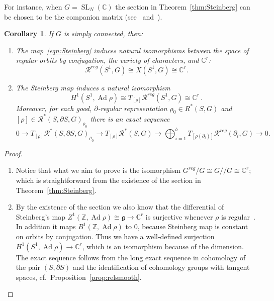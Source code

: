 \documentclass[11pt]{article}
\newtheorem{coro}[theo]{Corollary}
\theoremstyle{definition}
\newenvironment{proofc}{\begin{proof}}{\end{proof}}
\numberwithin{equation}{section}
\numberwithin{figure}{section}
\numberwithin{table}{section}
\DeclareMathOperator{\SL}{SL}
\DeclareMathOperator{\Ad}{Ad}
\newcommand{\Rcal}{\mathcal{R}}
\newcommand{\Cbb}{\mathbb{C}}
\newcommand{\Zbb}{\mathbb{Z}}
\newcommand{\gfrk}{\mathfrak{g}}
\newcommand*{\romanenumi}{\renewcommand*{\theenumi}{\roman{enumi}}}
\begin{document}
For instance, when $G=\SL_N (\Cbb)$ the section in Theorem~\ref{thm:Steinberg} can be chosen to be the companion matrix (see~\cite[p.~120]{Steinberg} and~\cite[Section~4.15]{Humphreys}).


\begin{coro}\label{coro:Steinberg}
If $G$ is simply connected, then:
\begin{enumerate}\romanenumi
\item \label{coro-i}
The map~\eqref{eqn:Steinberg} induces natural isomorphisms between the space of regular orbits by conjugation, the variety of characters, and $\Cbb^r$:
\[
\Rcal^{reg}(S^1, G)\cong X(S^1, G)\cong \Cbb^r.
\]
\item \label{coro-ii}
The Steinberg map induces a natural isomorphism
\[
H^ 1(S^1,\Ad\rho)\cong T_{[\rho]}\Rcal^{reg}(S^1, G)\cong \Cbb^r\,.
\]
Moreover, for each good, $\partial$-regular representation $\rho_0\in R^*(S,G)$ and $ [\rho]\in\Rcal^*(S,\partial S,G)_{\rho_0}$ there is an exact sequence
\[
0\to T_{[\rho]}\Rcal^*(S,\partial S,G)_{\rho_0} \to T_{[\rho]}\Rcal^*(S,G) \to \bigoplus_{i=1}^b T_{[\rho(\partial_i)]} \Rcal^{reg}(\partial_i, G)
\to 0.
\]
\end{enumerate}
\end{coro}

\begin{proofc}
\begin{enumerate}\romanenumi
\item[{\eqref{coro-i}}] Notice that what we aim to prove is the isomorphism $ G^{reg}/G\cong G /\!\!/ G\cong \Cbb^r$; which is straightforward from the existence of the section in Theorem~\ref{thm:Steinberg}.
\item[{\eqref{coro-ii}}] By the existence of the section we also know that the differential of Steinberg's map $Z^1(\Zbb,\Ad\rho)\cong \gfrk\to \Cbb^r$ is surjective whenever $\rho$ is regular~\cite[Section~4.19]{Humphreys}. In addition it maps $B^1(\Zbb,\Ad\rho)$ to $0$, because Steinberg map is constant on orbits by conjugation. Thus we have a well-defined surjection $H^1(S^1,\Ad\rho)\to \Cbb^r$, which is an isomorphism because of the dimension. The exact sequence follows from the long exact sequence in cohomology of the pair $(S,\partial S)$ and the identification of cohomology groups with tangent spaces, cf.~Proposition~\ref{prop:relsmooth}.\qedhere
\end{enumerate}
\end{proofc}
\end{document}
